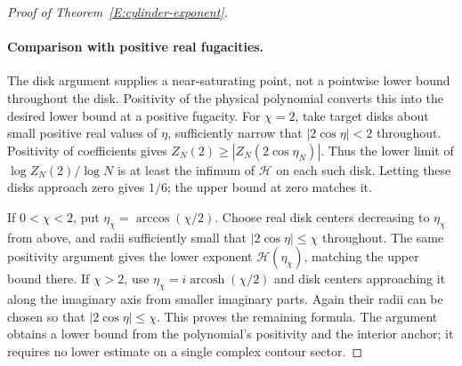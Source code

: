 \begin{proof}[Proof of Theorem~\ref{E:cylinder-exponent}]
\paragraph{Comparison with positive real fugacities.}
The disk argument supplies a near-saturating point, not a pointwise
lower bound throughout the disk. Positivity of the physical polynomial
converts this into the desired lower bound at a positive fugacity.
For \(\chi=2\), take target disks about small positive real values
of \(\eta\), sufficiently narrow that \(|2\cos\eta|<2\)
throughout. Positivity of coefficients gives
\(Z_N(2)\ge|Z_N(2\cos\eta_N)|\). Thus the lower limit of
\(\log Z_N(2)/\log N\) is at least the infimum of
\(\mathcal H\) on each such disk. Letting these disks approach
zero gives \(1/6\); the upper bound at zero matches it.

If \(0<\chi<2\), put \(\eta_\chi=\arccos(\chi/2)\).
Choose real disk centers decreasing to \(\eta_\chi\) from above,
and radii sufficiently small that \(|2\cos\eta|\le\chi\)
throughout. The same positivity argument gives the lower exponent
\(\mathcal H(\eta_\chi)\), matching the upper bound there.
If \(\chi>2\), use
\(\eta_\chi=i\operatorname{arcosh}(\chi/2)\) and disk centers
approaching it along the imaginary axis from smaller imaginary
parts. Again their radii can be chosen so that
\(|2\cos\eta|\le\chi\). This proves the remaining formula.
The argument obtains a lower bound from the polynomial's positivity
and the interior anchor; it requires no lower estimate on a single
complex contour sector.
\end{proof}
